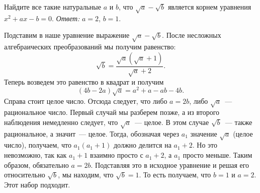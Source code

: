 \problem
Найдите все такие натуральные $a$ и $b$, что $\sqrt{a} - \sqrt{b}$ является
корнем уравнения $x^2 + a x - b = 0$.
\solution
\emph{Ответ:} $a = 2$, $b = 1$.
\par
Подставим в наше уравнение выражение $\sqrt{a} - \sqrt{b}$.
После несложных алгебраических преобразований мы получим равенство: 
\[
    \sqrt{b}
=
    \frac{\sqrt{a}(\sqrt{a} + 1)}{\sqrt{a} + 2}
.\]
Теперь возведем это равенство в квадрат и получим
\[
    (4 b - 2 a) \sqrt{a}
=
    a^2 + a - a b - 4 b
.\]
Справа стоит целое число.
Отсюда следует, что либо $a = 2 b$, либо $\sqrt{a}$~--- рациональное число.
Первый случай мы разберем позже, а из второго наблюдения немедленно следует,
что $\sqrt{a}$~--- целое.
В этом случае $\sqrt{b}$~--- также рациональное, а значит~--- целое.
Тогда, обозначая через $a_1$ значение $\sqrt{a}$ (целое число), получаем, что
$a_1 (a_1 + 1)$ должно делится на $a_1 + 2$.
Но это невозможно, так как $a_1 + 1$ взаимно просто с $a_1 + 2$, а $a_1$ просто
меньше.
Таким образом, обязательно $a = 2 b$.
Подставляя это в исходное уравнение и решая его относительно $\sqrt{b}$, мы
находим, что $\sqrt{b} = 1$.
То есть получаем, что $b = 1$ и $a = 2$.
Этот набор подходит.
\endproblem
